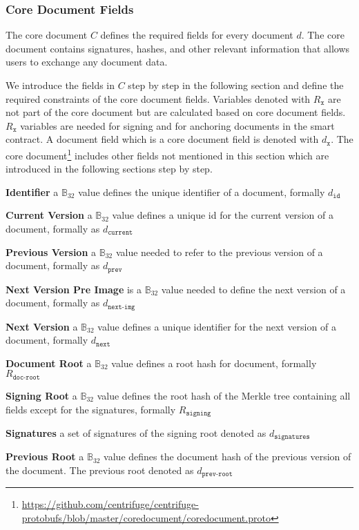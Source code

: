 \subsubsection{Core Document Fields\label{Core Document}}\label{sec:doc_core_doc_fields}
The core document $C$ defines the required fields for every document $d$.
The core document contains signatures, hashes, and other relevant information that allows users to exchange any document data.
 
We introduce the fields in $C$ step by step in the following section and define the required constraints of the core document fields. Variables denoted with $R_{\texttt{x}}$  are not part of the core document but are calculated based on core document fields. $R_{\texttt{x}}$ variables are needed for signing and for anchoring documents in the smart contract. A document field which is a core document field is denoted with $d_{\texttt{x}}$. 
The core document\footnote{\url{https://github.com/centrifuge/centrifuge-protobufs/blob/master/coredocument/coredocument.proto}} includes other fields not mentioned in this section which are introduced in the following sections step by step.
\begin{description} 
\item{\textbf{Identifier}} a $\mathbb{B}_{32}$ value defines the unique identifier of a document, formally $d_{\texttt{id}}$ 
\item{\textbf{Current Version}} a $\mathbb{B}_{32}$ value defines a unique id for the current version of a document, formally as $d_{\texttt{current}}$
\item{\textbf{Previous Version}} a $\mathbb{B}_{32}$ value needed to refer to the previous version of a document, formally as $d_{\texttt{prev}}$
\item{\textbf{Next Version Pre Image}} is a $\mathbb{B}_{32}$ value needed to define the next version of a document,  formally as $d_{\texttt{next-img}}$
\item{\textbf{Next Version}} a $\mathbb{B}_{32}$ value defines a unique identifier for the next version of a document, formally $d_{\texttt{next}}$
\item{\textbf{Document Root}} a $\mathbb{B}_{32}$ value defines a root hash for document, formally $R_{\texttt{doc-root}}$
\item{\textbf{Signing Root}} a $\mathbb{B}_{32}$ value defines the root hash of the Merkle tree containing all fields except for the signatures, formally $R_{\texttt{signing}}$
\item{\textbf{Signatures}} a set of signatures of the signing root denoted as $d_{\texttt{signatures}}$
\item{\textbf{Previous Root}} a $\mathbb{B}_{32}$ value defines the document hash of the previous version of the document. The previous root denoted as $d_{\texttt{prev-root}}$
\end{description}

